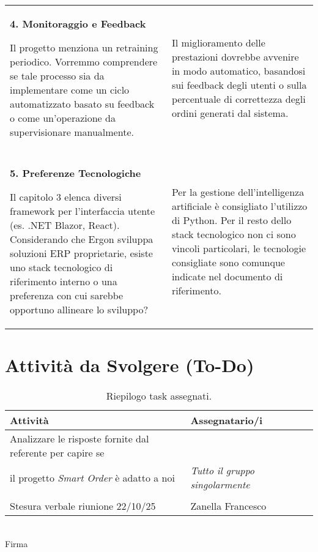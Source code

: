 \documentclass[a4paper, 11pt, oneside]{scrartcl} %
\begin{document}
\begin{tabular}{p{}p{}}
\textbf{4. Monitoraggio e Feedback}

Il progetto menziona un retraining periodico. Vorremmo comprendere se tale processo sia da implementare come un ciclo automatizzato basato su feedback o come un'operazione da supervisionare manualmente.
&
Il miglioramento delle prestazioni dovrebbe avvenire in modo automatico, basandosi sui feedback degli utenti o sulla percentuale di correttezza degli ordini generati dal sistema. \\
\\

\textbf{5. Preferenze Tecnologiche}

Il capitolo 3 elenca diversi framework per l'interfaccia utente (es. .NET Blazor, React). Considerando che Ergon sviluppa soluzioni ERP proprietarie, esiste uno stack tecnologico di riferimento interno o una preferenza con cui sarebbe opportuno allineare lo sviluppo?
&
Per la gestione dell'intelligenza artificiale è consigliato l'utilizzo di Python. Per il resto dello stack tecnologico non ci sono vincoli particolari, le tecnologie consigliate sono comunque indicate nel documento di riferimento. \\
\end{tabular}
\normalsize


\newpage
\section{Attività da Svolgere (To-Do)}

\begin{table}[h!]
\centering
\begin{tabular}{@{}lll@{}}
\toprule
\textbf{Attività} & \textbf{Assegnatario/i} \\
\midrule
Analizzare le risposte fornite dal referente per capire se \\il progetto \textit{Smart Order} è adatto a noi & \textit{Tutto il gruppo singolarmente}\\\\
Stesura verbale riunione 22/10/25 & Zanella Francesco \\
\bottomrule
\end{tabular}
\caption{Riepilogo task assegnati.}
\end{table}

\vspace{2cm}
\begin{flushright}
\makebox[6cm]{\hrulefill}\\
{\small Firma}
\end{flushright}
\end{document}
